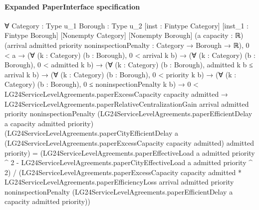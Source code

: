 \documentclass[10pt]{article}
\begin{document}
\paragraph{Expanded PaperInterface specification}
\begin{ReviewVerbatim}
∀ {Category : Type u_1} {Borough : Type u_2} [inst : Fintype Category] [inst_1 : Fintype Borough] [Nonempty Category]
  [Nonempty Borough] (a capacity : ℝ) (arrival admitted priority noninspectionPenalty : Category → Borough → ℝ),
  0 < a →
    (∀ (k : Category) (b : Borough), 0 < arrival k b) →
      (∀ (k : Category) (b : Borough), 0 < admitted k b) →
        (∀ (k : Category) (b : Borough), admitted k b ≤ arrival k b) →
          (∀ (k : Category) (b : Borough), 0 < priority k b) →
            (∀ (k : Category) (b : Borough), 0 ≤ noninspectionPenalty k b) →
              0 < LG24ServiceLevelAgreements.paperExcessCapacity capacity admitted →
                LG24ServiceLevelAgreements.paperRelativeCentralizationGain arrival admitted priority
                    noninspectionPenalty (LG24ServiceLevelAgreements.paperEfficientDelay a capacity admitted priority)
                    (LG24ServiceLevelAgreements.paperCityEfficientDelay a
                      (LG24ServiceLevelAgreements.paperExcessCapacity capacity admitted) admitted priority) =
                  (LG24ServiceLevelAgreements.paperEffectiveLoad a admitted priority ^ 2 -
                      LG24ServiceLevelAgreements.paperCityEffectiveLoad a admitted priority ^ 2) /
                    (LG24ServiceLevelAgreements.paperExcessCapacity capacity admitted *
                      LG24ServiceLevelAgreements.paperEfficiencyLoss arrival admitted priority noninspectionPenalty
                        (LG24ServiceLevelAgreements.paperEfficientDelay a capacity admitted priority))
\end{ReviewVerbatim}
\end{document}

